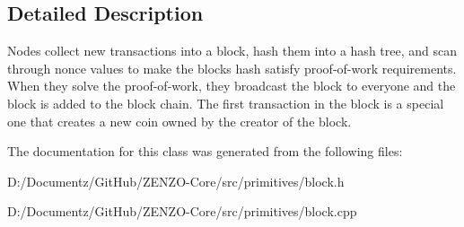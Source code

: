 \subsection{Detailed Description}
Nodes collect new transactions into a block, hash them into a hash tree, and scan through nonce values to make the block\textquotesingle{}s hash satisfy proof-\/of-\/work requirements. When they solve the proof-\/of-\/work, they broadcast the block to everyone and the block is added to the block chain. The first transaction in the block is a special one that creates a new coin owned by the creator of the block. 

The documentation for this class was generated from the following files\+:\begin{DoxyCompactItemize}
\item 
D\+:/\+Documentz/\+Git\+Hub/\+Z\+E\+N\+Z\+O-\/\+Core/src/primitives/block.\+h\item 
D\+:/\+Documentz/\+Git\+Hub/\+Z\+E\+N\+Z\+O-\/\+Core/src/primitives/block.\+cpp\end{DoxyCompactItemize}
